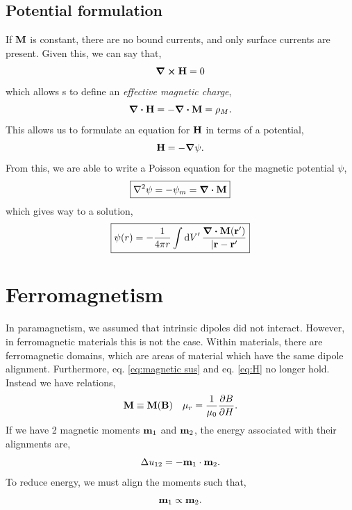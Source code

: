 \documentclass{book}
\begin{document}
\subsection{Potential formulation}
If $\vb{M}$ is constant, there are no bound currents, and only surface currents are present. Given this, we can say that,
\begin{equation}
	\curl{\vb{H}} = 0
\end{equation}
which allows s to define an \textit{effective magnetic charge},
\begin{equation}
	\div{\vb{H}} = - \div{\vb{M}} = \rho_{M}.
\end{equation}
This allows us to formulate an equation for $\vb{H}$ in terms of a potential,
\begin{equation}
	\vb{H} = - \grad \psi.
\end{equation}
From this, we are able to write a Poisson equation for the magnetic potential $\psi$,
\begin{equation}
	\boxed{\laplacian\psi = -\psi_m = \div{\vb{M}}} 
\end{equation}
which gives way to a solution,
\begin{equation}
	\boxed{\psi(r) = - \frac{1}{4\pi r}\int \dd{V}' \frac{\div{\vb{M}(\vb{r}')}}{|\vb{r} - \vb{r}'}}
\end{equation}

\section{Ferromagnetism}
In paramagnetism, we assumed that intrinsic dipoles did not interact. However, in ferromagnetic materials this is not the case. Within materials, there are ferromagnetic domains, which are areas of material which have the same dipole alignment. Furthermore, eq. \eqref{eq:magnetic sus} and eq. \eqref{eq:H} no longer hold. Instead we have relations,
\begin{align}
	\vb{M} \equiv \vb{M}(\vb{B}) && \mu_r = \frac{1}{\mu_0}\pdv{B}{H}.
\end{align} 
If we have 2 magnetic moments $\vb{m}_1$ and $\vb{m}_2$, the energy associated with their alignments are,
\begin{equation}
	\Delta u_{12} = - \vb{m}_1\cdot \vb{m}_2.
\end{equation}
To reduce energy, we must align the moments such that,
\begin{equation}
	\vb{m}_1 \propto \vb{m}_2.
\end{equation}
\end{document}

